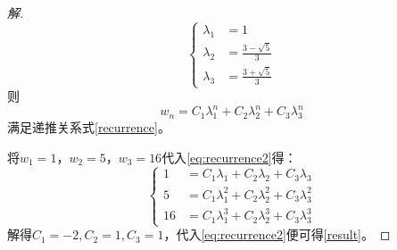 \documentclass{article}
\begin{document}
\begin{CJK}{UTF8}{gbsn}
\begin{proof}[解]
\begin{equation*}
   \begin{cases}
     \lambda_1 &= 1\\
     \lambda_2 &= \frac{3 - \sqrt{5}}{3}\\
     \lambda_3 &= \frac{3 + \sqrt{5}}{3}
   \end{cases}
 \end{equation*}
 则
 \begin{equation}
   \label{eq:recurrence2}
 w_n = C_1  \lambda_1 ^ n + C_2  \lambda_2^n + C_3  \lambda_3^n   
 \end{equation}
 满足递推关系式\eqref{recurrence}。

将$w_1 = 1$，$w_2 = 5$，$w_3 = 16$代入\eqref{eq:recurrence2}得：
 \begin{equation*}
   \begin{cases}
     1 &= C_1  \lambda_1 + C_2  \lambda_2 + C_3  \lambda_3\\
     5 &= C_1  \lambda_1 ^ 2 + C_2  \lambda_2^2 + C_3  \lambda_3^2\\
     16 &= C_1  \lambda_1 ^ 3 + C_2  \lambda_2^3 + C_3  \lambda_3^3
   \end{cases}
 \end{equation*}
解得$C_1=-2,C_2=1,C_3=1$，代入\eqref{eq:recurrence2}便可得\eqref{result}。
\end{proof}
\end{CJK}
\end{document}
